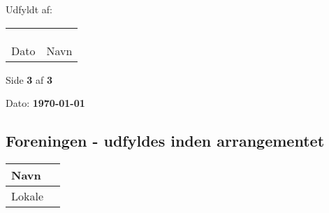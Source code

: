 \documentclass[a4paper, 11pt]{article}
\begin{document}
{{{{{{\vfill

\noindent
Udfyldt af:\\
\begin{tabular}{ll}
    & \\
    & \\
    & \\
    \hline
    Dato \hspace{3cm} & Navn \hspace{3cm}
\end{tabular}

\vfill

\begin{center}
    Side \textbf{3} af \textbf{3}
\end{center}

{%
{%
{%
{%
{%

{%

\noindent
\small{Dato: \textbf{\today} }

\subsection*{Foreningen - udfyldes inden arrangementet}

\begin{tabular}{|l|l|}
    \hline
    \begin{minipage}[t]{0.47\textwidth}
        Navn
        \vspace{0.5cm}
    \end{minipage} &
    \begin{minipage}[t]{0.47\textwidth}

    \end{minipage} \\
    \hline
    \begin{minipage}[t]{0.47\textwidth}
        Lokale
        \vspace{0.5cm}
    \end{minipage} &
    \begin{minipage}[t]{0.47\textwidth}


\end{minipage}
\end{tabular}}}}}}}}}}}}}
\end{document}
